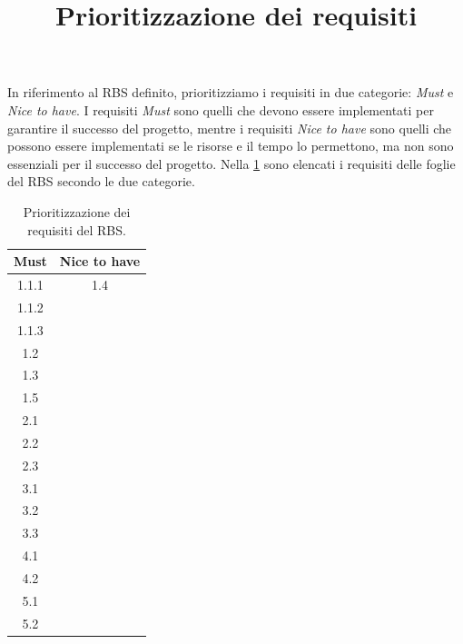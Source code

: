 \documentclass[a4paper,12pt]{article}
\title{\textbf{Prioritizzazione dei requisiti}}
\author{}
\date{}
\begin{document}
\maketitle

In riferimento al RBS definito, prioritizziamo i requisiti in due categorie: \textit{Must} e \textit{Nice to have}. I
requisiti \textit{Must} sono quelli che devono essere implementati per garantire il successo del progetto, mentre i
requisiti \textit{Nice to have} sono quelli che possono essere implementati se le risorse e il tempo lo permettono, ma
non sono essenziali per il successo del progetto. Nella \cref{table:requirements_prioritized} sono elencati i requisiti
delle foglie del RBS secondo le due categorie.

\begin{table}[!htb]
    \centering
    \begin{tabular}{|c|c|}
        \hline
        Must  & Nice to have \\
        \hline
        1.1.1 & 1.4          \\
        1.1.2 &              \\
        1.1.3 &              \\
        1.2   &              \\
        1.3   &              \\
        1.5   &              \\
        2.1   &              \\
        2.2   &              \\
        2.3   &              \\
        3.1   &              \\
        3.2   &              \\
        3.3   &              \\
        4.1   &              \\
        4.2   &              \\
        5.1   &              \\
        5.2   &              \\    
        \hline
    \end{tabular}
    \caption{Prioritizzazione dei requisiti del RBS.}
    \label{table:requirements_prioritized}
\end{table}
\end{document}
